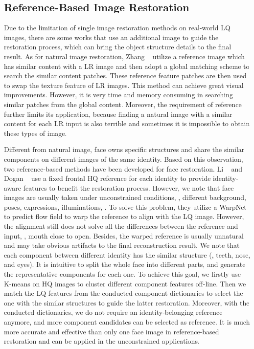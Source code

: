 \documentclass[runningheads]{llncs}
\begin{document}
\subsection{Reference-Based Image Restoration}
Due to the limitation of single image restoration methods on real-world LQ images, there are some works that use an additional image to guide the restoration process, which can bring the object structure details to the final result.  As for natural image restoration, Zhang \etal~\cite{zhang2019image} utilize a reference image which has similar content with a LR image and then adopt a global matching scheme to search the similar content patches. These reference feature patches are then used to swap the texture feature of LR images. This method can achieve great visual improvements. However, it is very time and memory consuming in searching similar patches from the global content. Moreover, the requirement of reference further limits its application, because finding a natural image with a similar content for each LR input is also terrible and sometimes it is impossible to obtain these types of image.  

Different from natural image, face owns specific structures and share the similar components on different images of the same identity. Based on this observation, two reference-based methods have been developed for face restoration. Li \etal~\cite{li2018learning} and Dogan \etal~\cite{dogan2019exemplar} use a fixed frontal HQ reference for each identity to provide identity-aware features to benefit the restoration process. However, we note that face images are usually taken under unconstrained conditions, \eg, different background, poses, expressions, illuminations, \etc. To solve this problem, they utilize a WarpNet to predict flow field to warp the reference to align with the LQ image. However, the alignment still does not solve all the differences between the reference and input, \ie, mouth close to open. Besides, the warped reference is usually unnatural and may take obvious artifacts to the final reconstruction result. We note that each component between different identity has the similar structure (\ie, teeth, nose, and eyes). It is intuitive to split the whole face into different parts, and generate the representative components for each one. To achieve this goal, we firstly use K-means on HQ images to cluster different component features off-line. Then we match the LQ features from the conducted component dictionaries to select the one with the similar structures to guide the latter restoration. Moreover, with the conducted dictionaries, we do not require an identity-belonging reference anymore, and more component candidates can be selected as reference. It is much more accurate and effective than only one face image in reference-based restoration and can be applied in the unconstrained applications.
\end{document}
